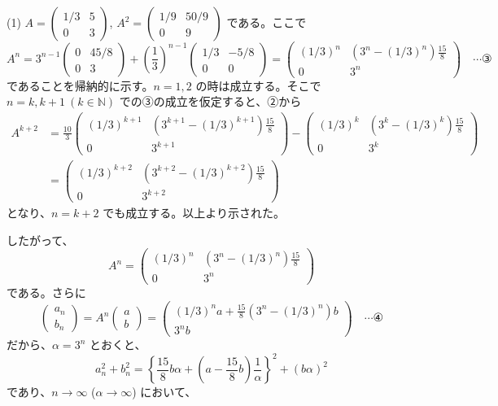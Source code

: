 \documentclass[../main.tex]{subfiles}
\begin{document}
\medskip
\noindent
(1) $A =
\begin{pmatrix} 1/3 & 5 \\ 0 & 3
\end{pmatrix}$, $A^2 =
\begin{pmatrix} 1/9 & 50/9 \\ 0 & 9
\end{pmatrix}$ である。ここで
\[
  A^n = 3^{n-1}
  \begin{pmatrix} 0 & 45/8 \\ 0 & 3
  \end{pmatrix} + \left(\frac{1}{3}\right)^{n-1}
  \begin{pmatrix} 1/3 & -5/8 \\ 0 & 0
  \end{pmatrix} =
  \begin{pmatrix} (1/3)^n & (3^n - (1/3)^n)\frac{15}{8} \\ 0 & 3^n
  \end{pmatrix} \quad \cdots \text{③}
\]
であることを帰納的に示す。$n=1,2$ の時は成立する。そこで $n=k, k+1 \ (k \in \mathbb{N})$ での③の成立を仮定すると、②から
\begin{align*}
  A^{k+2} &= \frac{10}{3}
  \begin{pmatrix} (1/3)^{k+1} & (3^{k+1} - (1/3)^{k+1})\frac{15}{8} \\ 0 & 3^{k+1}
  \end{pmatrix} -
  \begin{pmatrix} (1/3)^k & (3^k - (1/3)^k)\frac{15}{8} \\ 0 & 3^k
  \end{pmatrix} \\
  &=
  \begin{pmatrix} (1/3)^{k+2} & (3^{k+2} - (1/3)^{k+2})\frac{15}{8} \\ 0 & 3^{k+2}
  \end{pmatrix}
\end{align*}
となり、$n=k+2$ でも成立する。以上より示された。

したがって、
\[
  A^n =
  \begin{pmatrix} (1/3)^n & (3^n - (1/3)^n)\frac{15}{8} \\ 0 & 3^n
  \end{pmatrix}
\]
である。さらに
\[
  \begin{pmatrix} a_n \\ b_n
  \end{pmatrix} = A^n
  \begin{pmatrix} a \\ b
  \end{pmatrix} =
  \begin{pmatrix} (1/3)^n a + \frac{15}{8}(3^n - (1/3)^n) b \\ 3^n b
  \end{pmatrix} \quad \cdots \text{④}
\]
だから、$\alpha = 3^n$ とおくと、
\[
  a_n^2 + b_n^2 = \left\{ \frac{15}{8} b \alpha + \left(a - \frac{15}{8}b\right) \frac{1}{\alpha} \right\}^2 + (b\alpha)^2
\]
であり、$n \to \infty$ ($\alpha \to \infty$) において、
\end{document}
